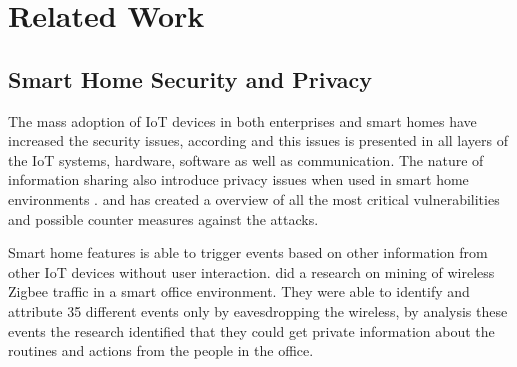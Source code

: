 \chapter{Related Work}



\section{Smart Home Security and Privacy}
The mass adoption of IoT devices in both enterprises and smart homes have increased the security issues, according \cite{Iotissues} and \cite{iotissues1} this issues is presented in all layers of the IoT systems, hardware, software as well as communication. The nature of information sharing also introduce privacy issues when used in smart home environments \cite{Iotissues}. \cite{Iotissues} and \cite{iotissues1} has created a overview of all the most critical vulnerabilities and possible counter measures against the attacks. 

Smart home features is able to trigger events based on other information from other IoT devices without user interaction. \cite{eavsIoT} did a research on mining of wireless Zigbee traffic in a smart office environment. They were able to identify and attribute 35 different events only by eavesdropping the wireless, by analysis these events the research identified that they could get private information about the routines and actions from the people in the office. 

